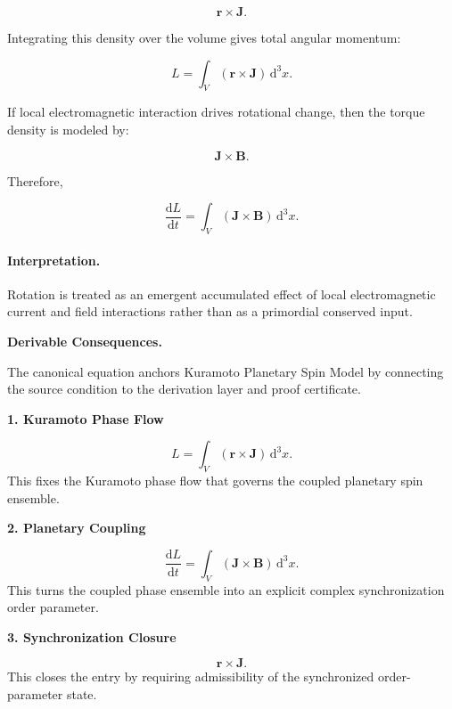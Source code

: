 \begin{equation}
\mathbf{r}\times\mathbf{J}.
\end{equation}

Integrating this density over the volume gives total angular momentum:

\begin{equation}
\boxed{
L
=
\int_V
(\mathbf{r}\times\mathbf{J})
\,\mathrm{d}^3x .
}
\end{equation}

If local electromagnetic interaction drives rotational change, then the torque density is modeled by:

\begin{equation}
\mathbf{J}\times\mathbf{B}.
\end{equation}

Therefore,

\begin{equation}
\boxed{
\frac{\mathrm{d}L}{\mathrm{d}t}
=
\int_V
(\mathbf{J}\times\mathbf{B})
\,\mathrm{d}^3x .
}
\end{equation}

\paragraph{Interpretation.}
Rotation is treated as an emergent accumulated effect of local electromagnetic current and field interactions rather than as a primordial conserved input.

\par\vspace{0.35em}
\noindent\textbf{Derivable Consequences.}\quad
\begingroup
\footnotesize
\raggedright
The canonical equation anchors Kuramoto Planetary Spin Model by connecting the source condition to the derivation layer and proof certificate.
\par\endgroup

\noindent\textbf{1. Kuramoto Phase Flow}\par
\[
L = \int_V (\mathbf{r}\times\mathbf{J}) \,\mathrm{d}^3x.
\]
\noindent This fixes the Kuramoto phase flow that governs the coupled planetary spin ensemble.\par
\noindent\textbf{2. Planetary Coupling}\par
\[
\frac{\mathrm{d}L}{\mathrm{d}t} = \int_V (\mathbf{J}\times\mathbf{B}) \,\mathrm{d}^3x.
\]
\noindent This turns the coupled phase ensemble into an explicit complex synchronization order parameter.\par
\noindent\textbf{3. Synchronization Closure}\par
\[
\mathbf{r}\times\mathbf{J}.
\]
\noindent This closes the entry by requiring admissibility of the synchronized order-parameter state.\par

